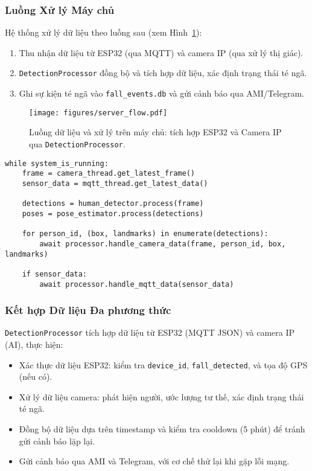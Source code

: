 \subsubsection{Luồng Xử lý Máy chủ}
\label{subsubsec:server_flow}

Hệ thống xử lý dữ liệu theo luồng sau (xem Hình~\ref{fig:server_flow}):
\begin{enumerate}
    \item Thu nhận dữ liệu từ ESP32 (qua MQTT) và camera IP (qua xử lý thị giác).
    \item \texttt{DetectionProcessor} đồng bộ và tích hợp dữ liệu, xác định trạng thái té ngã.
    \item Ghi sự kiện té ngã vào \texttt{fall\_events.db} và gửi cảnh báo qua AMI/Telegram.
\end{enumerate}

\begin{figure}[H]
\centering
\texttt{[image: figures/server\_flow.pdf]}
\caption{Luồng dữ liệu và xử lý trên máy chủ: tích hợp ESP32 và Camera IP qua \texttt{DetectionProcessor}.}
\label{fig:server_flow}
\end{figure}

\begin{verbatim}
while system_is_running:
    frame = camera_thread.get_latest_frame()
    sensor_data = mqtt_thread.get_latest_data()
    
    detections = human_detector.process(frame)
    poses = pose_estimator.process(detections)
    
    for person_id, (box, landmarks) in enumerate(detections):
        await processor.handle_camera_data(frame, person_id, box, landmarks)
    
    if sensor_data:
        await processor.handle_mqtt_data(sensor_data)
\end{verbatim}

\subsubsection{Kết hợp Dữ liệu Đa phương thức}
\label{subsubsec:multi_input_fusion}

\texttt{DetectionProcessor} tích hợp dữ liệu từ ESP32 (MQTT JSON) và camera IP (AI), thực hiện:
\begin{itemize}
    \item Xác thực dữ liệu ESP32: kiểm tra \texttt{device\_id}, \texttt{fall\_detected}, và tọa độ GPS (nếu có).
    \item Xử lý dữ liệu camera: phát hiện người, ước lượng tư thế, xác định trạng thái té ngã.
    \item Đồng bộ dữ liệu dựa trên timestamp và kiểm tra cooldown (5 phút) để tránh gửi cảnh báo lặp lại.
    \item Gửi cảnh báo qua AMI và Telegram, với cơ chế thử lại khi gặp lỗi mạng.
\end{itemize}

